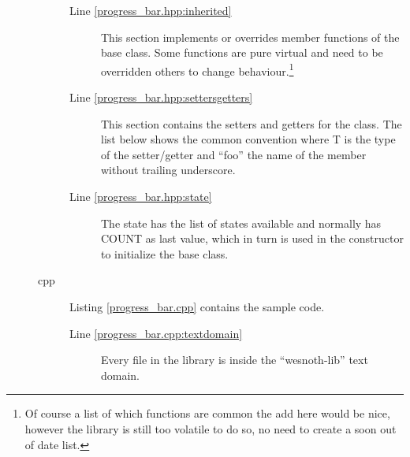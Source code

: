 \documentclass[a4paper,notitlepage]{report}
\begin{document}
\begin{description}
\begin{description}
\begin{description}
	\item[Line \ref{progress_bar.hpp:inherited}]
		This section implements or overrides member functions of the base class.
		Some functions are pure virtual and need to be overridden others to
		change behaviour.\footnote{Of course a list of which functions are
		common the add here would be nice, however the library is still too
		volatile to do so, no need to create a soon out of date list.}

	\item[Line \ref{progress_bar.hpp:settersgetters}]
		This section contains the setters and getters for the class. The
		list below shows the common convention where T is the type of the
		setter/getter and ``foo'' the name of the member without trailing
		underscore.


	\item[Line \ref{progress_bar.hpp:state}]
		The state has the list of states available and normally has COUNT as
		last value, which in turn is used in the constructor to initialize the
		base class.

	\end{description}

\item[cpp] Listing \ref{progress_bar.cpp} contains the sample code. 
	\begin{description}
	\item[Line \ref{progress_bar.cpp:textdomain}] Every file in the library
		is inside the ``wesnoth-lib'' text domain.


\end{description}
\end{description}
\end{description}
\end{document}
